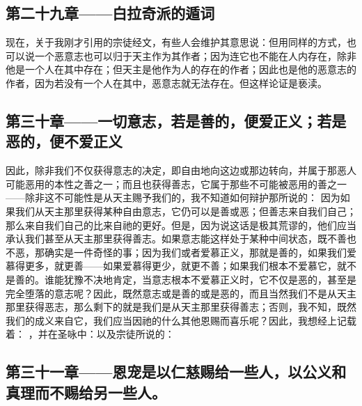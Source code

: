\subsection{第二十九章——白拉奇派的遁词}

现在，关于我刚才引用的宗徒经文，有些人会维护其意思说：但用同样的方式，也可以说一个恶意志也可以归于天主作为其作者；因为连它也不能在人内存在，除非他是一个人在其中存在；但天主是他作为人的存在的作者；因此也是他的恶意志的作者，因为若没有一个人在其中，恶意志就无法存在。但这样论证是亵渎。\par


\subsection{第三十章——一切意志，若是善的，便爱正义；若是恶的，便不爱正义}

因此，除非我们不仅获得意志的决定，即自由地向这边或那边转向，并属于那恶人可能恶用的本性之善之一；而且也获得善志，它属于那些不可能被恶用的善之一——除非这不可能性是从天主赐予我们的，我不知道如何辩护那所说的： 因为如果我们从天主那里获得某种自由意志，它仍可以是善或恶；但善志来自我们自己；那么来自我们自己的比来自祂的更好。但是，因为说这话是极其荒谬的，他们应当承认我们甚至从天主那里获得善志。如果意志能这样处于某种中间状态，既不善也不恶，那确实是一件奇怪的事；因为我们或者爱慕正义，那就是善的，如果我们爱慕得更多，就更善——如果爱慕得更少，就更不善；如果我们根本不爱慕它，就不是善的。谁能犹豫不决地肯定，当意志根本不爱慕正义时，它不仅是恶的，甚至是完全堕落的意志呢？因此，既然意志或是善的或是恶的，而且当然我们不是从天主那里获得恶志，那么剩下的就是我们是从天主那里获得善志；否则，我不知，既然我们的成义来自它，我们应当因祂的什么其他恩赐而喜乐呢？因此，我想经上记载着： ，并在圣咏中：以及宗徒所说的： \par


\subsection{第三十一章——恩宠是以仁慈赐给一些人，以公义和真理而不赐给另一些人。}

